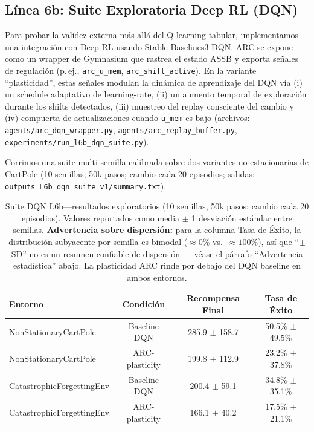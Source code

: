 \documentclass{article}
\begin{document}
\FloatBarrier
\subsection{Línea 6b: Suite Exploratoria Deep RL (DQN)}\label{sec:dqn_suite}

Para probar la validez externa más allá del Q-learning tabular, implementamos una integración con Deep RL usando Stable-Baselines3 DQN. ARC se expone como un wrapper de Gymnasium que rastrea el estado ASSB y exporta señales de regulación (p.\,ej., \texttt{arc\_u\_mem}, \texttt{arc\_shift\_active}). En la variante ``plasticidad'', estas señales modulan la dinámica de aprendizaje del DQN vía (i) un schedule adaptativo de learning-rate, (ii) un aumento temporal de exploración durante los shifts detectados, (iii) muestreo del replay consciente del cambio y (iv) compuerta de actualizaciones cuando \texttt{u\_mem} es bajo (archivos: \texttt{agents/arc\_dqn\_wrapper.py}, \texttt{agents/arc\_replay\_buffer.py}, \texttt{experiments/run\_l6b\_dqn\_suite.py}).

Corrimos una suite multi-semilla calibrada sobre dos variantes no-estacionarias de CartPole (10 semillas; 50k pasos; cambio cada 20 episodios; salidas: \texttt{outputs\_L6b\_dqn\_suite\_v1/summary.txt}).

\begin{table}[H]
\centering
\footnotesize
\caption{Suite DQN L6b---resultados exploratorios (10 semillas, 50k pasos; cambio cada 20 episodios). Valores reportados como media $\pm$ 1 desviación estándar entre semillas. \textbf{Advertencia sobre dispersión:} para la columna Tasa de Éxito, la distribución subyacente por-semilla es bimodal ($\approx 0\%$ vs.\ $\approx 100\%$), así que ``$\pm$SD'' no es un resumen confiable de dispersión --- véase el párrafo ``Advertencia estadística'' abajo. La plasticidad ARC rinde por debajo del DQN baseline en ambos entornos.}
\label{tab:g13_l6b_dqn}
\begin{tabular}{@{}lccc@{}}
\toprule
Entorno & Condición & Recompensa Final & Tasa de Éxito \\ \midrule
NonStationaryCartPole & Baseline DQN & 285.9 $\pm$ 158.7 & 50.5\% $\pm$ 49.5\% \\
NonStationaryCartPole & ARC-plasticity & 199.8 $\pm$ 112.9 & 23.2\% $\pm$ 37.8\% \\
CatastrophicForgettingEnv & Baseline DQN & 200.4 $\pm$ 59.1 & 34.8\% $\pm$ 35.1\% \\
CatastrophicForgettingEnv & ARC-plasticity & 166.1 $\pm$ 40.2 & 17.5\% $\pm$ 21.1\% \\ \bottomrule
\end{tabular}
\end{table}
\end{document}
